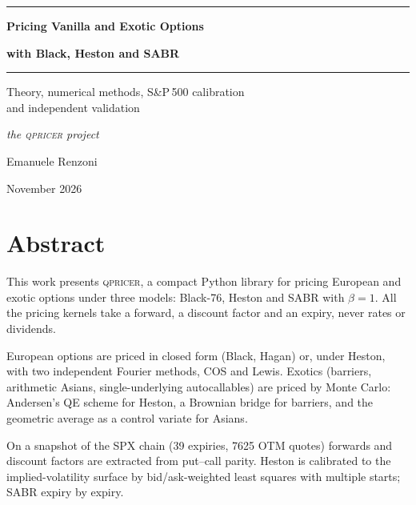 \documentclass[11pt,a4paper,openany]{book}
\makeatletter
\theoremstyle{definition}
\theoremstyle{plain}
\numberwithin{equation}{chapter}
\renewcommand\cleardoublepage{\clearpage\if@twoside\ifodd\c@page\else
  \hbox{}\thispagestyle{empty}\newpage\fi\fi}
\makeatother
\begin{document}
\frontmatter
\begin{titlepage}
\centering
\vspace*{0.18\textheight}
\rule{\textwidth}{0.8pt}\par
\vspace{0.9cm}
{\Huge\bfseries Pricing Vanilla and Exotic Options\par}
\vspace{0.35cm}
{\Huge\bfseries with Black, Heston and SABR\par}
\vspace{0.9cm}
\rule{\textwidth}{0.4pt}\par
\vspace{1.1cm}
{\Large Theory, numerical methods, S\&P\,500 calibration\\[5pt]
and independent validation\par}
\vspace{0.7cm}
{\large\itshape the \textup{\textsc{qpricer}} project\par}
\vfill
{\LARGE Emanuele Renzoni\par}
\vspace{0.5cm}
{\large November 2026\par}
\vspace*{0.06\textheight}
\end{titlepage}

\cleardoublepage
\chapter*{Abstract}

This work presents \textsc{qpricer}, a compact Python library for pricing European and exotic options under three
models: Black-76, Heston and SABR with $\beta=1$. All the pricing kernels take a forward, a discount factor and an
expiry, never rates or dividends.

European options are priced in closed form (Black, Hagan) or, under Heston, with two independent Fourier methods, COS
and Lewis. Exotics (barriers, arithmetic Asians, single-underlying autocallables) are priced by Monte Carlo:
Andersen's QE scheme for Heston, a Brownian bridge for barriers, and the geometric average as a control variate for
Asians.

On a snapshot of the SPX chain (39 expiries, 7625 OTM quotes) forwards and discount factors are extracted from
put--call parity. Heston is calibrated to the implied-volatility surface by bid/ask-weighted least squares with
multiple starts; SABR expiry by expiry.
\end{document}

